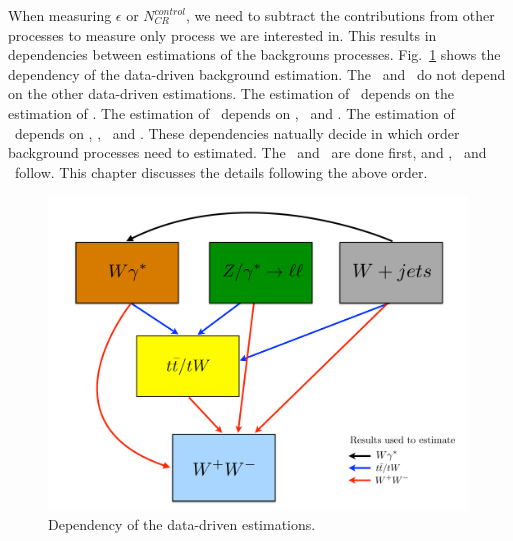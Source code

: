 When measuring $\epsilon$ or $N_{CR}^{control}$, we need to subtract 
the contributions from other processes to measure only process we 
are interested in. This results in dependencies between estimations 
of the backgrouns processes. Fig.~\ref{fig:bkgest_dependency} shows 
the dependency of the data-driven background estimation. 
The \dyll\ and \Wjets\ do not depend on the other data-driven estimations.
The estimation of \wgammastar\ depends on the estimation of \Wjets. 
The estimation of \topbkg\ depends on \wgammastar, \dyll\ and \Wjets. 
The estimation of \qqww\ depends on \wgammastar, \dyll,  \Wjets\ and \topbkg. 
These dependencies natually decide in which order background processes
need to estimated. The \dyll\ and \Wjets\ are done first, 
and \wgammastar, \topbkg\ and \qqww\ follow. This chapter discusses 
the details following the above order. 
\begin{figure}[ht!] 
\centering 
\includegraphics[width=0.99\textwidth]{figures/bkgest_schematic.pdf} 
\caption{Dependency of the data-driven estimations.} 
\label{fig:bkgest_dependency} 
\end{figure} 

\section{ \dyll }

